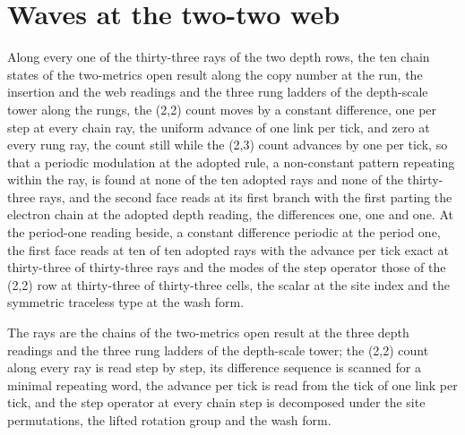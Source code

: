 \section{Waves at the two-two web}\label{mod:I-5-D543596-w-wvtw}
\begin{chwall}\label{box:I-5-D543596-w-wvtw:1}
Along every one of the thirty-three rays of the two depth rows, the ten chain states of the two-metrics open result along the copy number at the run, the insertion and the web readings and the three rung ladders of the depth-scale tower along the rungs, the (2,2) count moves by a constant difference, one per step at every chain ray, the uniform advance of one link per tick, and zero at every rung ray, the count still while the (2,3) count advances by one per tick, so that a periodic modulation at the adopted rule, a non-constant pattern repeating within the ray, is found at none of the ten adopted rays and none of the thirty-three rays, and the second face reads at its first branch with the first parting the electron chain at the adopted depth reading, the differences one, one and one. At the period-one reading beside, a constant difference periodic at the period one, the first face reads at ten of ten adopted rays with the advance per tick exact at thirty-three of thirty-three rays and the modes of the step operator those of the (2,2) row at thirty-three of thirty-three cells, the scalar at the site index and the symmetric traceless type at the wash form.
\end{chwall}
The rays are the chains of the two-metrics open result at the three depth readings and the three rung ladders of the depth-scale tower; the (2,2) count along every ray is read step by step, its difference sequence is scanned for a minimal repeating word, the advance per tick is read from the tick of one link per tick, and the step operator at every chain step is decomposed under the site permutations, the lifted rotation group and the wash form.

